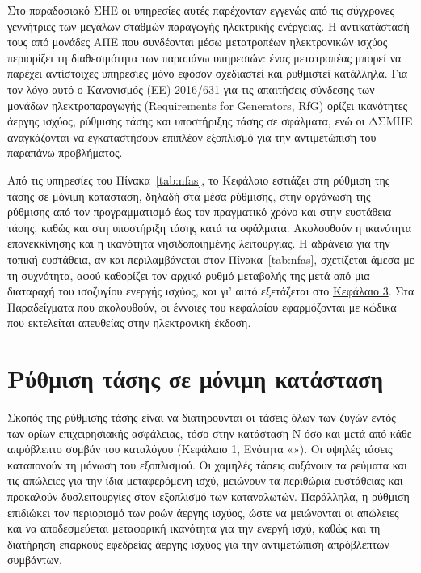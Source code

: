 Στο παραδοσιακό ΣΗΕ οι υπηρεσίες αυτές παρέχονταν εγγενώς από τις σύγχρονες γεννήτριες
των μεγάλων σταθμών παραγωγής ηλεκτρικής ενέργειας. Η αντικατάστασή τους από μονάδες ΑΠΕ που συνδέονται μέσω
μετατροπέων ηλεκτρονικών ισχύος περιορίζει τη διαθεσιμότητα των παραπάνω υπηρεσιών: ένας μετατροπέας μπορεί να παρέχει αντίστοιχες
υπηρεσίες μόνο εφόσον σχεδιαστεί και ρυθμιστεί κατάλληλα. Για τον λόγο αυτό ο Κανονισμός (ΕΕ) 2016/631 για τις απαιτήσεις σύνδεσης
των μονάδων ηλεκτροπαραγωγής (Requirements for Generators, RfG) ορίζει ικανότητες άεργης
ισχύος, ρύθμισης τάσης και υποστήριξης τάσης σε σφάλματα, ενώ οι ΔΣΜΗΕ αναγκάζονται να εγκαταστήσουν
επιπλέον εξοπλισμό για την αντιμετώπιση του παραπάνω προβλήματος.

Από τις υπηρεσίες του Πίνακα~\ref{tab:nfas}, το Κεφάλαιο εστιάζει στη ρύθμιση της τάσης σε
μόνιμη κατάσταση, δηλαδή στα μέσα ρύθμισης, στην οργάνωση της ρύθμισης από τον προγραμματισμό
έως τον πραγματικό χρόνο και στην ευστάθεια τάσης, καθώς και στη υποστήριξη τάσης
κατά τα σφάλματα. Ακολουθούν η ικανότητα επανεκκίνησης και η ικανότητα νησιδοποιημένης
λειτουργίας. Η αδράνεια για την τοπική ευστάθεια, αν και περιλαμβάνεται στον Πίνακα~\ref{tab:nfas}, σχετίζεται
άμεσα με τη συχνότητα, αφού καθορίζει τον αρχικό ρυθμό μεταβολής της μετά από μια διαταραχή του
ισοζυγίου ενεργής ισχύος, και γι' αυτό εξετάζεται στο \hyperref[kef-03-theoria]{Κεφάλαιο 3}.
Στα Παραδείγματα που ακολουθούν, οι έννοιες του κεφαλαίου εφαρμόζονται με κώδικα που εκτελείται
απευθείας στην ηλεκτρονική έκδοση.

\section{Ρύθμιση τάσης σε μόνιμη κατάσταση}
\label{sec:v-control}

Σκοπός της ρύθμισης τάσης είναι να διατηρούνται οι τάσεις όλων των ζυγών εντός των ορίων
επιχειρησιακής ασφάλειας, τόσο στην κατάσταση N όσο και μετά από κάθε απρόβλεπτο συμβάν του
καταλόγου (Κεφάλαιο 1, Ενότητα «»). Οι υψηλές τάσεις καταπονούν τη μόνωση του
εξοπλισμού. Οι χαμηλές τάσεις αυξάνουν τα ρεύματα και τις απώλειες για την ίδια μεταφερόμενη
ισχύ, μειώνουν τα περιθώρια ευστάθειας και προκαλούν δυσλειτουργίες στον εξοπλισμό των
καταναλωτών. Παράλληλα, η ρύθμιση επιδιώκει τον περιορισμό των ροών άεργης ισχύος, ώστε να
μειώνονται οι απώλειες και να αποδεσμεύεται μεταφορική ικανότητα για την ενεργή ισχύ, καθώς
και τη διατήρηση επαρκούς εφεδρείας άεργης ισχύος για την αντιμετώπιση απρόβλεπτων
συμβάντων.

